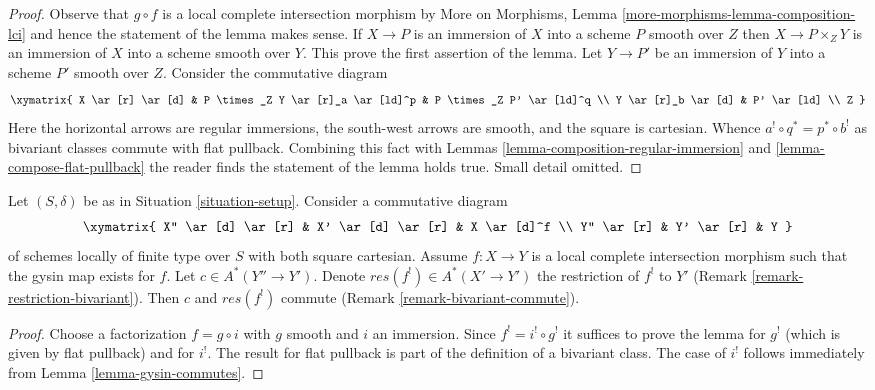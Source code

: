 \begin{proof}
Observe that $g \circ f$ is a local complete intersection morphism
by More on Morphisms, Lemma \ref{more-morphisms-lemma-composition-lci}
and hence the statement of the lemma makes sense.
If $X \to P$ is an immersion of $X$ into a scheme $P$ smooth over $Z$
then $X \to P \times_Z Y$ is an immersion of $X$ into a scheme smooth
over $Y$. This prove the first assertion of the lemma.
Let $Y \to P'$ be an immersion of $Y$ into a scheme $P'$ smooth over $Z$.
Consider the commutative diagram
$$
\xymatrix{
X \ar[r] \ar[d] &
P \times_Z Y \ar[r]_a \ar[ld]^p &
P \times_Z P' \ar[ld]^q \\
Y \ar[r]_b \ar[d] &
P' \ar[ld] \\
Z
}
$$
Here the horizontal arrows are regular immersions, the south-west arrows
are smooth, and the square is cartesian. Whence
$a^! \circ q^* = p^* \circ b^!$ as bivariant classes commute
with flat pullback. Combining this fact with
Lemmas \ref{lemma-composition-regular-immersion} and
\ref{lemma-compose-flat-pullback}
the reader finds the statement of the lemma holds true.
Small detail omitted.
\end{proof}

\begin{lemma}
\label{lemma-lci-gysin-commutes}
Let $(S, \delta)$ be as in Situation \ref{situation-setup}.
Consider a commutative diagram
$$
\xymatrix{
X'' \ar[d] \ar[r] &
X' \ar[d] \ar[r] &
X \ar[d]^f \\
Y'' \ar[r] &
Y' \ar[r] &
Y
}
$$
of schemes locally of finite type over $S$ with both square cartesian.
Assume $f : X \to Y$ is a local complete intersection morphism
such that the gysin map exists for $f$. Let $c \in A^*(Y'' \to Y')$. Denote
$res(f^!) \in A^*(X' \to Y')$ the restriction of $f^!$ to $Y'$
(Remark \ref{remark-restriction-bivariant}). Then $c$ and $res(f^!)$ commute
(Remark \ref{remark-bivariant-commute}).
\end{lemma}

\begin{proof}
Choose a factorization $f = g \circ i$ with $g$ smooth and $i$ an immersion.
Since $f^! = i^! \circ g^!$ it suffices to prove the lemma for $g^!$
(which is given by flat pullback) and for $i^!$. The result for flat pullback
is part of the definition of a bivariant class. The case of $i^!$ follows
immediately from Lemma \ref{lemma-gysin-commutes}.
\end{proof}

